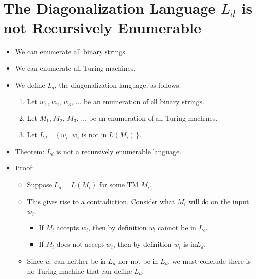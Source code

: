 \documentclass[]{article}
\begin{document}
\section{The Diagonalization Language $L_d$ is not Recursively Enumerable}
\begin{itemize}
\item We can enumerate all binary strings.
\item We can enumerate all Turing machines.
\item We define $L_d$, the diagonalization language, as follows:
\begin{enumerate}
\item Let $w_1$, $w_2$, $w_3$, $\ldots$ be an enumeration of all binary strings.
\item Let $M_1$, $M_2$, $M_3$, $\ldots$ be an enumeration of all Turing
machines.
\item Let $L_d = \{\,w_i\,|\,w_i$ is not in $L(M_i)\,\}$.
\end{enumerate}
\item Theorem: $L_d$ is not a recursively enumerable language.
\item Proof:
\begin{itemize}
\item Suppose $L_d = L(M_i)$ for some TM $M_i$.
\item This gives rise to a contradiction. Consider what $M_i$ will do on the
input $w_i$.
\begin{itemize}
\item If $M_i$ accepts $w_i$, then by definition $w_i$ cannot be in $L_d$.
\item If $M_i$ does not accept $w_i$, then by definition $w_i$ is in$L_d$.
\end{itemize}
\item Since $w_i$ can neither be in $L_d$ nor not be in $L_d$, we must conclude
there is no Turing machine that can define $L_d$.
\end{itemize}
\end{itemize}
\end{document}
